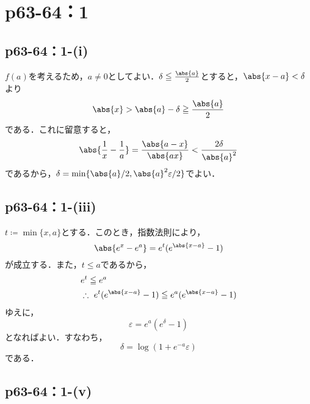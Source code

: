 \documentclass[a4paper,10pt,fleqn]{ltjsarticle}
\begin{document}
    \newpage 


    \section*{p63-64：1}

    \subsection*{p63-64：1-(i)}

\begin{tleftbar}
    $f(a)$を考えるため，$a \ne 0$としてよい．$\delta \le \frac{\abs{a}}{2}$とすると，$\abs{x-a}<\delta$より
    \[
       \abs{x} > \abs{a}-\delta \ge \frac{\abs{a}}{2}
    \]
    である．これに留意すると，
    \[
        \abs{\frac{1}{x}-\frac{1}{a}}=\frac{\abs{a-x}}{\abs{ax}} <\frac{2 \delta}{\abs{a}^2}
    \]
    であるから，$\delta = \min \{ \abs{a}/2,\abs{a}^2\varepsilon/2 \}$でよい．
\end{tleftbar}



\subsection*{p63-64：1-(iii)}


\begin{tleftbar}
    $t \coloneqq \min \{x,a\}$とする．このとき，指数法則により，
    \[
        \abs{e^x-e^a}=e^t (e^{\abs{x-a}}-1)
    \]
    が成立する．また，$t \le a$であるから，
    \begin{align*}
       & e^t \le e^a \\
        & \therefore ~ e^t(e^{\abs{x-a}}-1) \le e^a(e^{\abs{x-a}}-1)
    \end{align*}
    ゆえに，
    \[
        \varepsilon = e^a (e^\delta -1)
    \]
    となればよい．すなわち，
    \[
        \delta = \log (1+e^{-a}\varepsilon)
    \]
    である．
\end{tleftbar}


\subsection*{p63-64：1-(v)}
\end{document}
